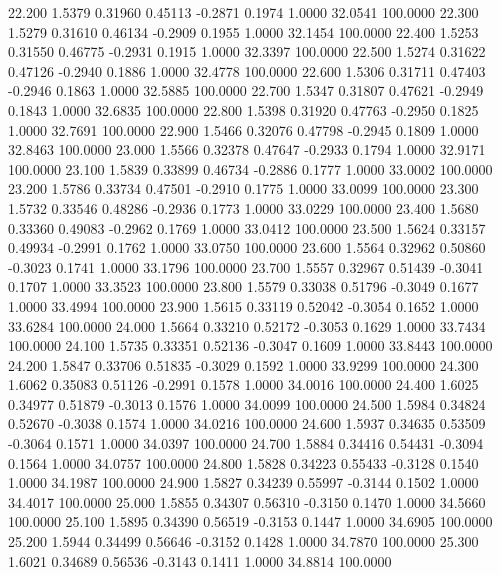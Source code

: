   22.200   1.5379   0.31960   0.45113  -0.2871   0.1974   1.0000  32.0541 100.0000
  22.300   1.5279   0.31610   0.46134  -0.2909   0.1955   1.0000  32.1454 100.0000
  22.400   1.5253   0.31550   0.46775  -0.2931   0.1915   1.0000  32.3397 100.0000
  22.500   1.5274   0.31622   0.47126  -0.2940   0.1886   1.0000  32.4778 100.0000
  22.600   1.5306   0.31711   0.47403  -0.2946   0.1863   1.0000  32.5885 100.0000
  22.700   1.5347   0.31807   0.47621  -0.2949   0.1843   1.0000  32.6835 100.0000
  22.800   1.5398   0.31920   0.47763  -0.2950   0.1825   1.0000  32.7691 100.0000
  22.900   1.5466   0.32076   0.47798  -0.2945   0.1809   1.0000  32.8463 100.0000
  23.000   1.5566   0.32378   0.47647  -0.2933   0.1794   1.0000  32.9171 100.0000
  23.100   1.5839   0.33899   0.46734  -0.2886   0.1777   1.0000  33.0002 100.0000
  23.200   1.5786   0.33734   0.47501  -0.2910   0.1775   1.0000  33.0099 100.0000
  23.300   1.5732   0.33546   0.48286  -0.2936   0.1773   1.0000  33.0229 100.0000
  23.400   1.5680   0.33360   0.49083  -0.2962   0.1769   1.0000  33.0412 100.0000
  23.500   1.5624   0.33157   0.49934  -0.2991   0.1762   1.0000  33.0750 100.0000
  23.600   1.5564   0.32962   0.50860  -0.3023   0.1741   1.0000  33.1796 100.0000
  23.700   1.5557   0.32967   0.51439  -0.3041   0.1707   1.0000  33.3523 100.0000
  23.800   1.5579   0.33038   0.51796  -0.3049   0.1677   1.0000  33.4994 100.0000
  23.900   1.5615   0.33119   0.52042  -0.3054   0.1652   1.0000  33.6284 100.0000
  24.000   1.5664   0.33210   0.52172  -0.3053   0.1629   1.0000  33.7434 100.0000
  24.100   1.5735   0.33351   0.52136  -0.3047   0.1609   1.0000  33.8443 100.0000
  24.200   1.5847   0.33706   0.51835  -0.3029   0.1592   1.0000  33.9299 100.0000
  24.300   1.6062   0.35083   0.51126  -0.2991   0.1578   1.0000  34.0016 100.0000
  24.400   1.6025   0.34977   0.51879  -0.3013   0.1576   1.0000  34.0099 100.0000
  24.500   1.5984   0.34824   0.52670  -0.3038   0.1574   1.0000  34.0216 100.0000
  24.600   1.5937   0.34635   0.53509  -0.3064   0.1571   1.0000  34.0397 100.0000
  24.700   1.5884   0.34416   0.54431  -0.3094   0.1564   1.0000  34.0757 100.0000
  24.800   1.5828   0.34223   0.55433  -0.3128   0.1540   1.0000  34.1987 100.0000
  24.900   1.5827   0.34239   0.55997  -0.3144   0.1502   1.0000  34.4017 100.0000
  25.000   1.5855   0.34307   0.56310  -0.3150   0.1470   1.0000  34.5660 100.0000
  25.100   1.5895   0.34390   0.56519  -0.3153   0.1447   1.0000  34.6905 100.0000
  25.200   1.5944   0.34499   0.56646  -0.3152   0.1428   1.0000  34.7870 100.0000
  25.300   1.6021   0.34689   0.56536  -0.3143   0.1411   1.0000  34.8814 100.0000
